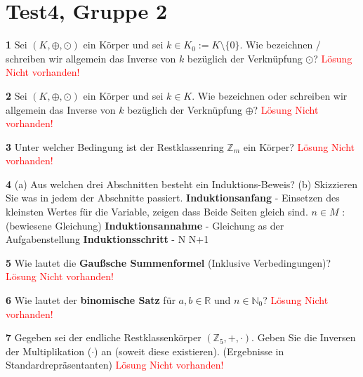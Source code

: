 \documentclass[11pt]{article}
\begin{document}
\section{Test4, Gruppe 2}

    \textbf{1} Sei \((K, \oplus, \odot)\) ein Körper und sei \(k \in K_0 := K \setminus \{0\}\). Wie bezeichnen / schreiben wir allgemein das Inverse von \(k\) bezüglich der Verknüpfung \(\odot\)?\newline
    \textcolor{red}{Lösung Nicht vorhanden!}\newline

    \textbf{2} Sei \((K, \oplus, \odot)\) ein Körper und sei \(k \in K\). Wie bezeichnen oder schreiben wir allgemein das Inverse von \(k\) bezüglich der Verknüpfung \(\oplus\)?\newline
    \textcolor{red}{Lösung Nicht vorhanden!}\newline

    \textbf{3} Unter welcher Bedingung ist der Restklassenring \(\mathbb{Z}_m\) ein Körper?\newline
    \textcolor{red}{Lösung Nicht vorhanden!}\newline

    \textbf{4} (a) Aus welchen drei Abschnitten besteht ein Induktions-Beweis? (b) Skizzieren Sie was in jedem der Abschnitte passiert.\newline\newline
    \textbf{Induktionsanfang} - Einsetzen des kleinsten Wertes für die Variable, zeigen dass Beide Seiten gleich sind. \(n \in M\) : (bewiesene Gleichung)\newline
    \textbf{Induktionsannahme} - Gleichung as der Aufgabenstellung\newline
    \textbf{Induktionsschritt} - N \rightarrow N+1\newline
    
    \textbf{5} Wie lautet die \textbf{Gaußsche Summenformel} (Inklusive Verbedingungen)?\newline
    \textcolor{red}{Lösung Nicht vorhanden!}\newline

    \textbf{6} Wie lautet der \textbf{binomische Satz} für \( a, b \in \mathbb{R} \) und \( n \in \mathbb{N}_0 \)?\newline
    \textcolor{red}{Lösung Nicht vorhanden!}\newline

    \textbf{7} Gegeben sei der endliche Restklassenkörper \((\mathbb{Z}_5, +, \cdot)\). Geben Sie die Inversen der Multiplikation (\(\cdot\)) an (soweit diese existieren). (Ergebnisse in Standardrepräsentanten)\newline
    \textcolor{red}{Lösung Nicht vorhanden!}\newline
\end{document}
